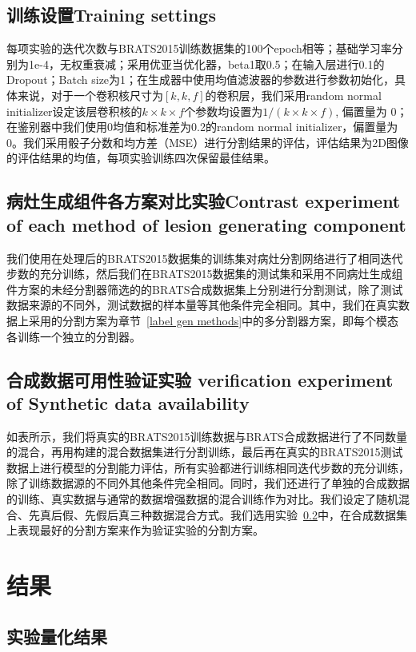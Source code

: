 \documentclass[letterpaper]{article} %
\begin{document}
\subsection{训练设置Training settings}
每项实验的迭代次数与BRATS2015训练数据集的100个epoch相等；基础学习率分别为1e-4，无权重衰减；采用优亚当优化器，beta1取0.5；在输入层进行0.1的Dropout；Batch size为1；在生成器中使用均值滤波器的参数进行参数初始化，具体来说，对于一个卷积核尺寸为$[k,k,f]$的卷积层，我们采用random normal initializer设定该层卷积核的$k\times k\times f$个参数均设置为$1/(k\times k\times f)$, 偏置量为 0；在鉴别器中我们使用0均值和标准差为0.2的random normal initializer，偏置量为0。我们采用骰子分数\cite{95dice1945measures}和均方差（MSE）\cite{94prasad1990the}进行分割结果的评估，评估结果为2D图像的评估结果的均值，每项实验训练四次保留最佳结果。

\subsection{病灶生成组件各方案对比实验Contrast experiment of each method of lesion generating component}
\label{label gen methods tests}
我们使用在处理后的BRATS2015数据集的训练集对病灶分割网络进行了相同迭代步数的充分训练，然后我们在BRATS2015数据集的测试集和采用不同病灶生成组件方案的未经分割器筛选的的BRATS合成数据集上分别进行分割测试，除了测试数据来源的不同外，测试数据的样本量等其他条件完全相同。其中，我们在真实数据上采用的分割方案为章节~\ref{label gen methods}中的多分割器方案，即每个模态各训练一个独立的分割器。

\subsection{合成数据可用性验证实验 verification experiment of Synthetic data availability}
如表所示，我们将真实的BRATS2015训练数据与BRATS合成数据进行了不同数量的混合，再用构建的混合数据集进行分割训练，最后再在真实的BRATS2015测试数据上进行模型的分割能力评估，所有实验都进行训练相同迭代步数的充分训练，除了训练数据源的不同外其他条件完全相同。同时，我们还进行了单独的合成数据的训练、真实数据与通常的数据增强数据的混合训练作为对比。我们设定了随机混合、先真后假、先假后真三种数据混合方式。我们选用实验~\ref{label gen methods tests}中，在合成数据集上表现最好的分割方案来作为验证实验的分割方案。

\section{结果}
\subsection{实验量化结果}
\end{document}
